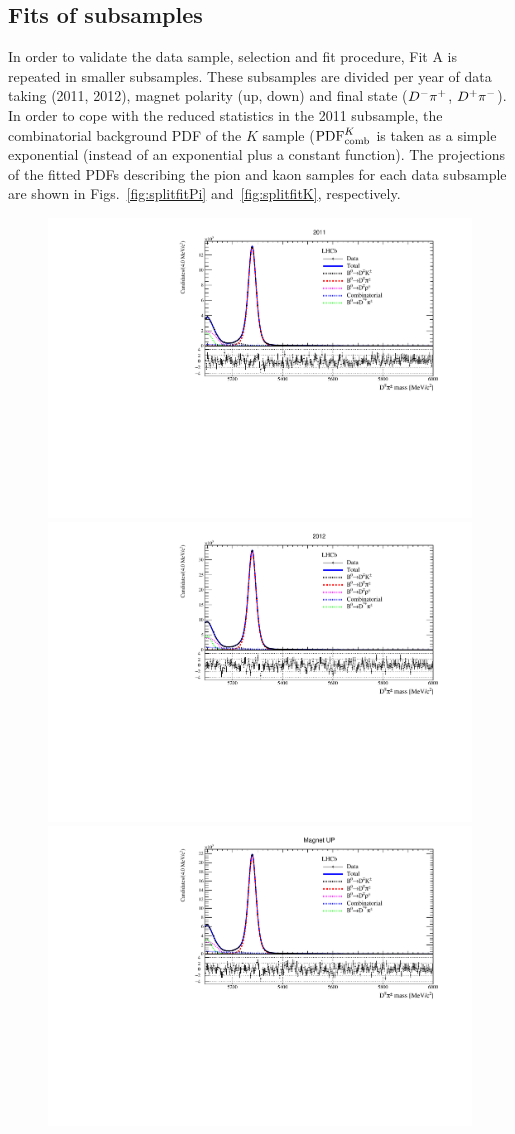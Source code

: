 \subsection{Fits of subsamples}
\label{sec:split}
In order to validate the data sample, selection and fit procedure,
Fit A is repeated in smaller subsamples. These subsamples are divided per year of data taking
(2011, 2012), magnet polarity (up, down) and final state ($D^-\pi^+$, $D^+\pi^-$).
In order to cope with the reduced statistics in the 2011 subsample, the combinatorial background PDF of the $K$ sample (${\rm{PDF}}^{K}_{\rm comb}$ is taken as a simple exponential (instead of an exponential plus a constant function).
The projections of the fitted PDFs describing the pion and kaon samples for each data
subsample are shown in Figs.~\ref{fig:splitfitPi}
and~\ref{fig:splitfitK}, respectively.
\begin{figure}[t]
	\begin{center}
		\includegraphics[width=0.48\linewidth]{03Massfit/figs/MDFitPlots_Bd_2011/MDFit_BeautyMass_Bd2DPi_withPulls.pdf}
		\includegraphics[width=0.48\linewidth]{03Massfit/figs/MDFitPlots_Bd_2012/MDFit_BeautyMass_Bd2DPi_withPulls.pdf} \\
		\includegraphics[width=0.48\linewidth]{03Massfit/figs/MDFitPlots_Bd_MU/MDFit_BeautyMass_Bd2DPi_withPulls.pdf}

\end{center}
\end{figure}
